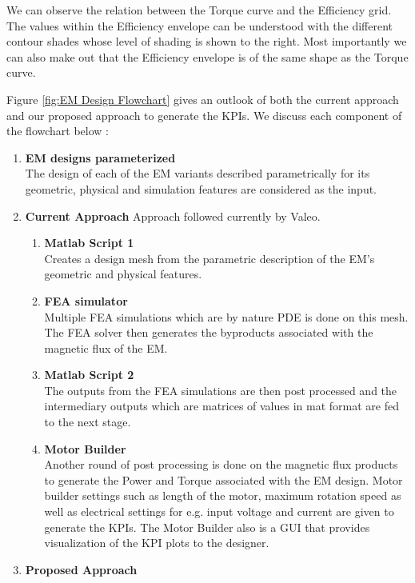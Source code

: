 \documentclass{report} %
\begin{document}
We can observe the relation between the Torque curve and the Efficiency grid. 
The values within the Efficiency envelope can be understood with the different contour shades whose level of shading is shown to the right.
Most importantly we can also make out that the Efficiency envelope is of the same shape as the Torque curve.

Figure \ref{fig:EM Design Flowchart} gives an outlook of both the current approach and our proposed approach to generate the \ac{KPI}s.
We discuss each component of the flowchart below :
\begin{enumerate}
    \item \textbf{\ac{EM} designs parameterized} \\
    The design of each of the \ac{EM} variants described parametrically for its geometric, physical and simulation features are considered as the input.
    \item \textbf{Current Approach}
    Approach followed currently by Valeo.
    \begin{enumerate}
        \item \textbf{Matlab Script 1} \\
        Creates a design mesh from the parametric description of the \ac{EM}'s geometric and physical features.
        \item \textbf{\ac{FEA} simulator} \\
        Multiple \ac{FEA} simulations which are by nature \ac{PDE} is done on this mesh. The \ac{FEA} solver then 
        generates the byproducts associated with the magnetic flux of the \ac{EM}.
        \item \textbf{Matlab Script 2} \\
        The outputs from the \ac{FEA} simulations are then post processed and the intermediary outputs which are matrices of values in mat format are fed to the next stage.
        \item \textbf{Motor Builder} \\
        Another round of post processing is done on the magnetic flux products to generate the Power and Torque associated with the \ac{EM} design.
        Motor builder settings such as length of the motor, maximum rotation speed as well as electrical settings for e.g. input voltage and current are given to 
        generate the \ac{KPI}s. The Motor Builder also is a GUI that provides visualization of the \ac{KPI} plots to the designer.
    \end{enumerate}
    \item \textbf{Proposed Approach}

\end{enumerate}
\end{document}
